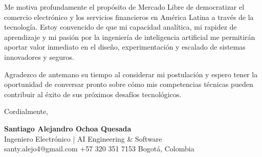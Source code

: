\documentclass[11pt,a4paper]{article}
\begin{document}
Me motiva profundamente el propósito de Mercado Libre de democratizar el comercio electrónico y los servicios financieros en América Latina a través de la tecnología. Estoy convencido de que mi capacidad analítica, mi rapidez de aprendizaje y mi pasión por la ingeniería de inteligencia artificial me permitirán aportar valor inmediato en el diseño, experimentación y escalado de sistemas innovadores y seguros.

Agradezco de antemano su tiempo al considerar mi postulación y espero tener la oportunidad de conversar pronto sobre cómo mis competencias técnicas pueden contribuir al éxito de sus próximos desafíos tecnológicos.

\vspace{10pt}
\noindent Cordialmente,

\vspace{12pt}
\noindent
\textbf{\large\color{accent} Santiago Alejandro Ochoa Quesada}\\
{\small\color{subtletext} Ingeniero Electrónico | AI Engineering \& Software}\\
{\footnotesize\color{subtletext} santy.alejo4@gmail.com \;\textbar\; +57 320 351 7153 \;\textbar\; Bogotá, Colombia}
\end{document}
